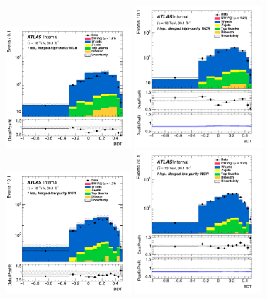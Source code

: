 \begin{figure}[!ht]
	\centering
	\includegraphics[width=0.42\textwidth]{Chapter5/BDT_1lep_HP_WCR_prefit.pdf}	\includegraphics[width=0.42\textwidth]{Chapter5/BDT_1lep_HP_WCR_postfit.pdf}
	\includegraphics[width=0.42\textwidth]{Chapter5/BDT_1lep_LP_WCR_prefit.pdf}
	\includegraphics[width=0.42\textwidth]{Chapter5/BDT_1lep_LP_WCR_postfit.pdf}

\end{figure}
